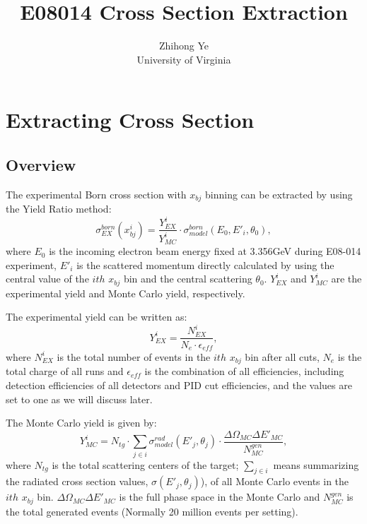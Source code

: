 \documentclass[a4paper,10.5pt]{report}
\title{E08014 Cross Section Extraction}
\author{Zhihong Ye\\ University of Virginia}
\begin{document}
\maketitle
\section{Extracting Cross Section}

\subsection{Overview}

The experimental Born cross section with $x_{bj}$ binning can be extracted by using the Yield Ratio method:
\begin{equation}
   \sigma^{born}_{EX}(x_{bj}^{i}) = \frac{ Y^{i}_{EX}}{Y^{i}_{MC}} \cdot \sigma^{born}_{model}(E_{0},E'_{i}, \theta_{0}),
   \label{eqxs}
\end{equation}
where $E_{0}$ is the incoming electron beam energy fixed at 3.356GeV during E08-014 experiment, $E'_{i}$ is the scattered momentum directly calculated by using the central value of the $ith$ $x_{bj}$ bin and the central scattering $\theta_{0}$. $Y^{i}_{EX}$ and $Y^{i}_{MC}$ are the experimental yield and Monte Carlo yield, respectively.

The experimental yield can be written as:
\begin{equation}
   Y^{i}_{EX} = \frac{N^{i}_{EX}}{N_{e} \cdot \epsilon_{eff}},
 \label{eqyex}
\end{equation}
where $N^{i}_{EX}$ is the total number of events in the $ith$ $x_{bj}$ bin after all cuts, $N_{e}$ is the total charge of all runs and $\epsilon_{eff}$ is the combination of all efficiencies, including detection efficiencies of all detectors and PID cut efficiencies, and the values are set to one as we will discuss later.

The Monte Carlo yield is given by:
\begin{equation}
   Y^{i}_{MC} = N_{tg}\cdot \sum_{j\in i}\sigma^{rad}_{model}(E'_{j},\theta_{j}) \cdot \frac{\Delta\Omega_{MC} \Delta E'_{MC}}{N_{MC}^{gen}} ,
   \label{eqymc}
\end{equation}
where $N_{tg}$ is the total scattering centers of the target; $\sum_{j\in i}$ means summarizing the radiated cross section values, $\sigma(E'_{j},\theta_{j})$), of all Monte Carlo events in the $ith$ $x_{bj}$ bin. $\Delta\Omega_{MC} \Delta E'_{MC}$ is the full phase space in the Monte Carlo and $N_{MC}^{gen}$ is the total generated events (Normally 20 million events per setting).
\end{document}
